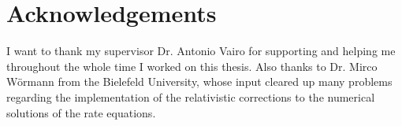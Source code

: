 \chapter*{Acknowledgements}
I want to thank my supervisor Dr. Antonio Vairo for supporting and helping me throughout the whole time I worked on this thesis. \newline \indent
Also thanks to Dr. Mirco Wörmann from the Bielefeld University, whose input cleared up many problems regarding the implementation of the relativistic corrections to the numerical solutions of the rate equations.

